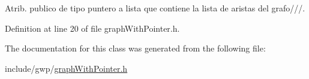 Atrib. publico de tipo puntero a lista que contiene la lista de aristas del grafo///. 



Definition at line 20 of file graph\+With\+Pointer.\+h.



The documentation for this class was generated from the following file\+:\begin{DoxyCompactItemize}
\item 
include/gwp/\hyperlink{graph_with_pointer_8h}{graph\+With\+Pointer.\+h}\end{DoxyCompactItemize}

